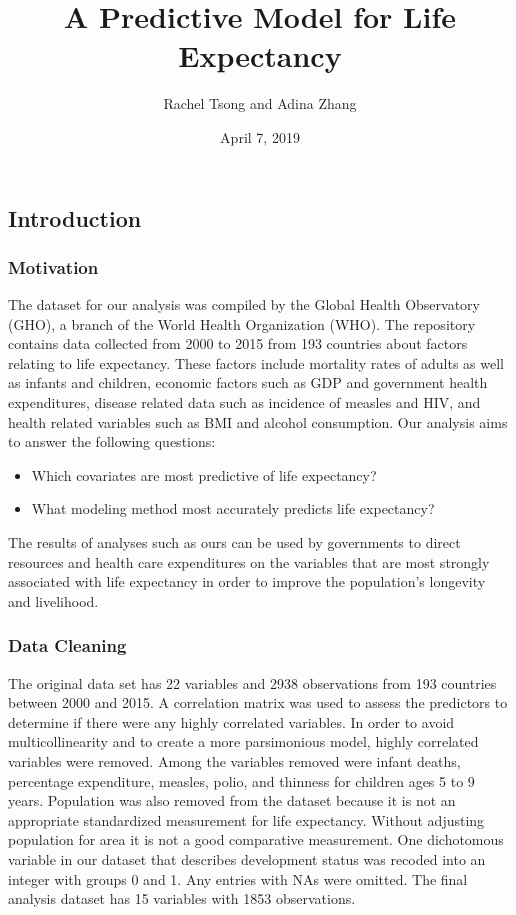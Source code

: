 \documentclass[]{article}
\title{A Predictive Model for Life Expectancy}
\author{Rachel Tsong and Adina Zhang}
\date{April 7, 2019}
\providecommand{\tightlist}{%
  \setlength{\itemsep}{0pt}\setlength{\parskip}{0pt}}
\begin{document}
\maketitle

\subsection{Introduction}\label{introduction}

\subsubsection{Motivation}\label{motivation}

The dataset for our analysis was compiled by the Global Health
Observatory (GHO), a branch of the World Health Organization (WHO). The
repository contains data collected from 2000 to 2015 from 193 countries
about factors relating to life expectancy. These factors include
mortality rates of adults as well as infants and children, economic
factors such as GDP and government health expenditures, disease related
data such as incidence of measles and HIV, and health related variables
such as BMI and alcohol consumption. Our analysis aims to answer the
following questions:

\begin{itemize}
\tightlist
\item
  Which covariates are most predictive of life expectancy?
\item
  What modeling method most accurately predicts life expectancy?
\end{itemize}

The results of analyses such as ours can be used by governments to
direct resources and health care expenditures on the variables that are
most strongly associated with life expectancy in order to improve the
population's longevity and livelihood.

\subsubsection{Data Cleaning}\label{data-cleaning}

The original data set has 22 variables and 2938 observations from 193
countries between 2000 and 2015. A correlation matrix was used to assess
the predictors to determine if there were any highly correlated
variables. In order to avoid multicollinearity and to create a more
parsimonious model, highly correlated variables were removed. Among the
variables removed were infant deaths, percentage expenditure, measles,
polio, and thinness for children ages 5 to 9 years. Population was also
removed from the dataset because it is not an appropriate standardized
measurement for life expectancy. Without adjusting population for area
it is not a good comparative measurement. One dichotomous variable in
our dataset that describes development status was recoded into an
integer with groups 0 and 1. Any entries with NAs were omitted. The
final analysis dataset has 15 variables with 1853 observations.
\end{document}
